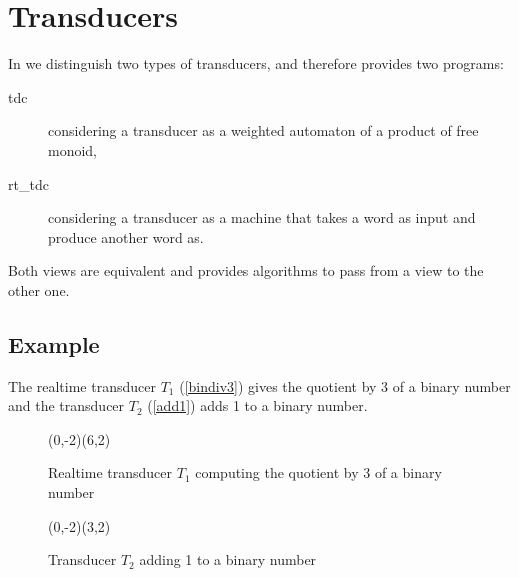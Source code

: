 \newpage
\section{Transducers}

In \Vauc we distinguish two types of transducers, and therefore
provides two programs:
\begin{description}
\item[tdc] considering a transducer as a weighted automaton of a
  product of free monoid,
\item[rt\_tdc] considering a transducer as a machine that takes a word
  as input and produce another word as.
\end{description}
Both views are equivalent and \Vauc provides algorithms to pass from a
view to the other one.

\subsection{Example}

The realtime transducer $T_1$ (\autoref{bindiv3}) gives the quotient
by 3 of a binary number and the transducer $T_2$ (\autoref{add1}) adds
1 to a binary number.


\begin{figure}[h]
  \begin{center}
    \begin{VCPicture}{(0,-2)(6,2)}
  
\end{VCPicture}
\caption{Realtime transducer $T_1$ computing the quotient by 3 of a binary number}
\label{bindiv3}
  \end{center}
\end{figure}
\begin{figure}[h]
  \begin{center}
    \begin{VCPicture}{(0,-2)(3,2)}
 
\end{VCPicture}
\caption{Transducer $T_2$ adding 1 to a binary number}
\label{add1}
  \end{center}
\end{figure}

